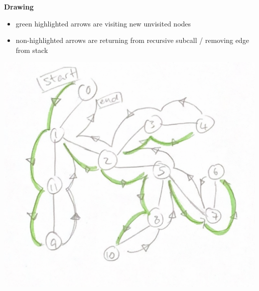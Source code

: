 \documentclass{article}
\begin{document}
\begin{minipage}[t]{.6\textwidth}
\textbf{Drawing}

\begin{itemize}
	\item green highlighted arrows are visiting new unvisited nodes
	\item non-highlighted arrows are returning from recursive subcall / removing edge from stack
\end{itemize}

\includegraphics[scale=0.40]{q1pic.png}
\end{minipage}

\newpage
\end{document}
